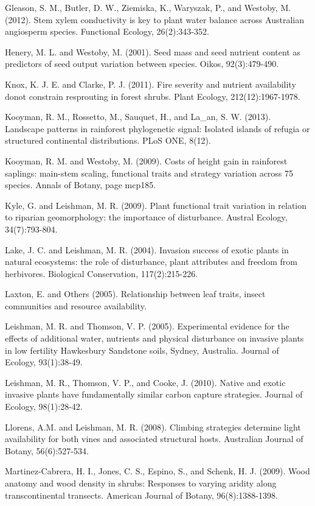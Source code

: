 \documentclass[openright,12pt,a4paper]{memoir}
\begin{document}
Gleason, S. M., Butler, D. W., Ziemiska, K., Waryszak, P., and Westoby, M. (2012). Stem xylem conductivity is key to plant water balance across Australian angiosperm species. 
Functional Ecology, 26(2):343-352.

Henery, M. L. and Westoby, M. (2001). Seed mass and seed nutrient content as predictors of seed output variation between species. Oikos, 92(3):479-490.

Knox, K. J. E. and Clarke, P. J. (2011). Fire severity and nutrient availability donot constrain resprouting in forest shrubs. Plant Ecology, 212(12):1967-1978.

Kooyman, R. M., Rossetto, M., Sauquet, H., and La_an, S. W. (2013). Landscape patterns in rainforest phylogenetic signal: Isolated islands of refugia or structured continental distributions. PLoS ONE, 8(12).

Kooyman, R. M. and Westoby, M. (2009). Costs of height gain in rainforest saplings: main-stem scaling, functional traits and strategy variation across 75 species. Annals of Botany, page mcp185.

Kyle, G. and Leishman, M. R. (2009). Plant functional trait variation in relation to riparian geomorphology: the importance of disturbance. Austral Ecology, 34(7):793-804.

Lake, J. C. and Leishman, M. R. (2004). Invasion success of exotic plants in natural ecosystems: the role of disturbance, plant attributes and freedom from herbivores. Biological Conservation, 117(2):215-226.

Laxton, E. and Others (2005). Relationship between leaf traits, insect communities and resource availability.

Leishman, M. R. and Thomson, V. P. (2005). Experimental evidence for the effects of additional water, nutrients and physical disturbance on invasive plants in low fertility Hawkesbury Sandstone soils, Sydney, Australia. Journal of Ecology, 93(1):38-49.

Leishman, M. R., Thomson, V. P., and Cooke, J. (2010). Native and exotic invasive plants have fundamentally similar carbon capture strategies. Journal of Ecology, 98(1):28-42.

Llorens, A.M. and Leishman, M. R. (2008). Climbing strategies determine light availability for both vines and associated structural hosts. Australian Journal of Botany, 56(6):527-534.

Martinez-Cabrera, H. I., Jones, C. S., Espino, S., and Schenk, H. J. (2009). Wood anatomy and wood density in shrubs: Responses to varying aridity along transcontinental transects. 
American Journal of Botany, 96(8):1388-1398.
\end{document}
